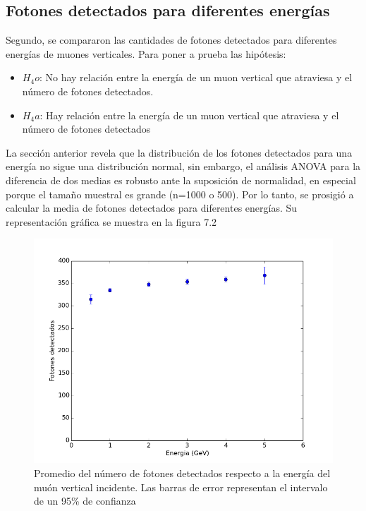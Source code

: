 \documentclass{book}
\begin{document}
\subsection{Fotones detectados para diferentes energ\'ias}
Segundo, se compararon las cantidades de fotones detectados para diferentes energ\'ias de muones verticales. Para poner a prueba las hip\'otesis:

\begin{itemize}
\item $H_4o$: No hay relaci\'on entre la energ\'ia de un muon vertical que atraviesa y el n\'umero de fotones detectados.
\item $H_4a$: Hay relaci\'on entre la energ\'ia de un muon vertical que atraviesa y el n\'umero de fotones detectados
\end{itemize}

La secci\'on anterior revela que la distribuci\'on de los fotones detectados para una energ\'ia no sigue una distribuci\'on normal, sin embargo, el an\'alisis ANOVA para la diferencia de dos medias es robusto ante la suposici\'on de normalidad, en especial porque el tama\~no muestral es grande (n=1000 o 500). Por lo tanto, se prosigi\'o a calcular la media de fotones detectados para diferentes energ\'ias. Su representaci\'on gr\'afica se muestra en la figura 7.2

\begin{figure}[h] %
\begin{center}
 \includegraphics[width=0.8\linewidth]{DetectadosVsEnergia.png}
\caption{Promedio del n\'umero de fotones detectados respecto a la energ\'ia del mu\'on vertical incidente. Las barras de error representan el intervalo de un 95\% de confianza}
\end{center}
\end{figure}
\end{document}
